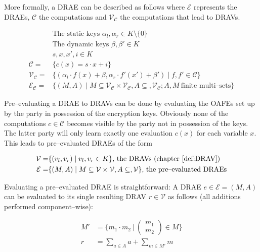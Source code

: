 More formally, a DRAE can be described as follows where $\mathcal{E}$ represents
the DRAEs, $\mathcal{C}$ the computations and $\mathcal{V}_\mathcal{C}$ the
computations that lead to DRAVs.

\begin{align}
%
  &\text{The static keys } \alpha_l, \alpha_r \in K \setminus \{0\} \nonumber\\
%
  &\text{The dynamic keys } \beta, \beta' \in K \nonumber\\
%
  &s, x, x', i \in K \nonumber\\
%
  \mathcal{C} = & \{ c(x) = s \cdot x + i \} \nonumber\\
%
  \mathcal{V}_\mathcal{C} = & \{ (\alpha_l \cdot f(x) + \beta,
                      \alpha_r \cdot f'(x') + \beta' )
                    \mid f, f' \in \mathcal{C} \} \nonumber\\
%
  \label{rel:DRAE}
  \mathcal{E}_\mathcal{C} = & \{ (M, A) \mid
      M \subseteq \mathcal{V}_\mathcal{C} \times
      \mathcal{V}_\mathcal{C}, A \subseteq, \mathcal{V}_\mathcal{C};
  A, M~\text{finite multi--sets} \}
%
\end{align}

Pre--evaluating a DRAE to DRAVs can be done by evaluating the OAFEs set up by
the party in possession of the encryption keys. Obviously none of the
computations $c \in \mathcal{C}$ becomes visible by the party not in possession
of the keys. The latter party will only learn exactly one evaluation $c(x)$ for
each variable $x$. This leads to pre--evaluated DRAEs of the form

\begin{align}
  \mathcal{V} = & \{ (v_l, v_r) \mid v_l, v_r \in K \}
  \text{, the DRAVs (chapter \ref{def:DRAV})} \nonumber\\
%
  \label{rel:pre-eval-DRAE}
  \mathcal{E} = & \{ (M, A) \mid
      M \subseteq \mathcal{V} \times \mathcal{V}, A \subseteq, \mathcal{V} \}
      \text{, the pre--evaluated DRAEs}
\end{align}

Evaluating a pre--evaluated DRAE is straightforward: A DRAE $e \in \mathcal{E} =
(M,A)$ can be evaluated to its single resulting DRAV $r \in \mathcal{V}$ as
follows (all additions performed component--wise):

\begin{align*}
M' &= \Bigg\{ m_1 \cdot m_2\ \Bigg|\ \begin{pmatrix}m_1\\m_2\end{pmatrix}
\in M \Bigg\} \\
r & = \sum_{a \in A}a + \sum_{m \in M'}m
\end{align*}


